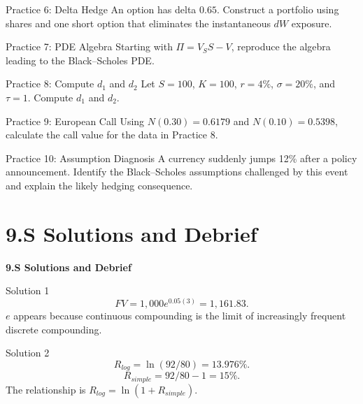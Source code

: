 \documentclass[aspectratio=169]{beamer}
\begin{document}
\begin{frame}[t]{Practice 6: Delta Hedge}
\justifying
An option has delta $0.65$. Construct a portfolio using shares and one short option that eliminates the instantaneous $dW$ exposure.
\end{frame}

\begin{frame}[t]{Practice 7: PDE Algebra}
\justifying
Starting with $\Pi=V_SS-V$, reproduce the algebra leading to the Black--Scholes PDE.
\end{frame}

\begin{frame}[t]{Practice 8: Compute $d_1$ and $d_2$}
\justifying
Let $S=100$, $K=100$, $r=4\%$, $\sigma=20\%$, and $\tau=1$. Compute $d_1$ and $d_2$.
\end{frame}

\begin{frame}[t]{Practice 9: European Call}
\justifying
Using $N(0.30)=0.6179$ and $N(0.10)=0.5398$, calculate the call value for the data in Practice 8.
\end{frame}

\begin{frame}[t]{Practice 10: Assumption Diagnosis}
\justifying
A currency suddenly jumps 12\% after a policy announcement. Identify the Black--Scholes assumptions challenged by this event and explain the likely hedging consequence.
\end{frame}

\section{9.S Solutions and Debrief}
\begin{frame}[plain]
\centering\vfill
{\color{TitleBlue}\Large\bfseries 9.S Solutions and Debrief}\par
\vspace{0.5cm}{\large Detailed answers}\par
\vfill\end{frame}

\begin{frame}[t]{Solution 1}
\justifying
\[FV=1{,}000e^{0.05(3)}=\boxed{1{,}161.83}.\]
$e$ appears because continuous compounding is the limit of increasingly frequent discrete compounding.
\end{frame}

\begin{frame}[t]{Solution 2}
\justifying
\[R_{log}=\ln(92/80)=\boxed{13.976\%}.\]
\[R_{simple}=92/80-1=\boxed{15\%}.\]
The relationship is $R_{log}=\ln(1+R_{simple})$.
\end{frame}
\end{document}
